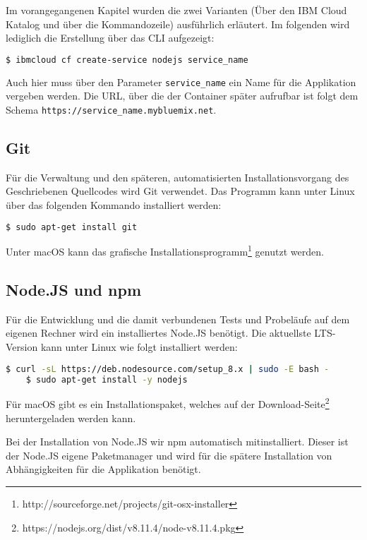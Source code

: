 Im vorangegangenen Kapitel wurden die zwei Varianten (Über den IBM Cloud Katalog und über die Kommandozeile) ausführlich
erläutert. Im folgenden wird lediglich die Erstellung über das CLI aufgezeigt:

\begin{lstlisting}[language=bash, caption=Instanziierung der Node.JS Runtime, label=Instanziierung der Node.JS Runtime]
    $ ibmcloud cf create-service nodejs service_name
\end{lstlisting}

Auch hier muss über den Parameter \texttt{service\_name} ein Name für die Applikation vergeben werden. Die URL, über die der
Container später aufrufbar ist folgt dem Schema \texttt{https://service\_name.mybluemix.net}.

\subsection{Git}
Für die Verwaltung und den späteren, automatisierten Installationsvorgang des Geschriebenen Quellcodes wird Git verwendet.
Das Programm kann unter Linux über das folgenden Kommando installiert werden:

\begin{lstlisting}[language=bash, caption=Installation von Git, label=Installation von Git]
    $ sudo apt-get install git
\end{lstlisting}

Unter macOS kann das grafische Installationsprogramm\footnote{http://sourceforge.net/projects/git-osx-installer} genutzt
werden.

\subsection{Node.JS und npm}
Für die Entwicklung und die damit verbundenen Tests und Probeläufe auf dem eigenen Rechner wird ein installiertes Node.JS
benötigt. Die aktuellste LTS-Version kann unter Linux wie folgt installiert werden:

\begin{lstlisting}[language=bash, caption=Installation von Node.JS, label=Installation von Node.JS]
    $ curl -sL https://deb.nodesource.com/setup_8.x | sudo -E bash -
    $ sudo apt-get install -y nodejs
\end{lstlisting}

Für macOS gibt es ein Installationspaket, welches auf der Download-Seite\footnote{https://nodejs.org/dist/v8.11.4/node-v8.11.4.pkg}
heruntergeladen werden kann.

Bei der Installation von Node.JS wir npm automatisch mitinstalliert. Dieser ist der Node.JS eigene Paketmanager und wird
für die spätere Installation von Abhängigkeiten für die Applikation benötigt.